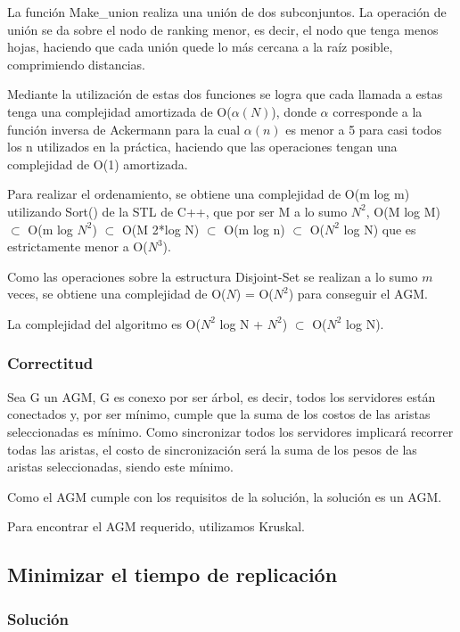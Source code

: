 \documentclass[a4paper, 10pt, twoside]{article}
\begin{document}
La función Make\_union realiza una unión de dos subconjuntos. La operación de unión se da sobre el nodo de ranking menor, es decir, el nodo que tenga menos hojas, haciendo que cada unión quede lo más cercana a la raíz posible, comprimiendo distancias.

Mediante la utilización de estas dos funciones se logra que cada llamada a estas tenga una complejidad amortizada de O($\alpha(N)$), donde $\alpha$ corresponde a la función inversa de Ackermann para la cual $\alpha(n)$ es menor a 5 para casi todos los n utilizados en la práctica, haciendo que las operaciones tengan una complejidad de O(1) amortizada.

Para realizar el ordenamiento, se obtiene una complejidad de O(m log m) utilizando Sort() de la STL de C++, que por ser M a lo sumo $N^2$, O(M log M) $\subset$ O(m log $N^2$) $\subset$ O(M 2*log N) $\subset$ O(m log n) $\subset$ O($N^2$ log N) que es estrictamente menor a O($N^3$).

Como las operaciones sobre la estructura Disjoint-Set se realizan a lo sumo $m$ veces, se obtiene una complejidad de O($N$) = O($N^2$) para conseguir el AGM.

La complejidad del algoritmo es O($N^2$ log N + $N^2$) $\subset$ O($N^2$ log N).

\subsubsection{Correctitud}
Sea G un AGM, G es conexo por ser árbol, es decir, todos los servidores están conectados y, por ser mínimo, cumple que la suma de los costos de las aristas seleccionadas es mínimo. Como sincronizar todos los servidores implicará recorrer todas las aristas, el costo de sincronización será la suma de los pesos de las aristas seleccionadas, siendo este mínimo.

Como el AGM cumple con los requisitos de la solución, la solución es un AGM.

Para encontrar el AGM requerido, utilizamos Kruskal.

\subsection{Minimizar el tiempo de replicación}

\subsubsection{Solución}
\end{document}
